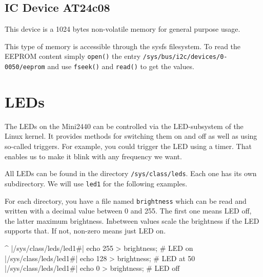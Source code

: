 
\newcommand{\perEepromName}{AT24c08}
\newcommand{\perEepromSize}{1024 bytes}
\newcommand{\perEepromPath}{0-0050}

\subsection{I\texttwosuperior C Device \perEepromName {}}	\label{sec:EEPROM}

This device is a \perEepromSize{} non-volatile memory for general purpose usage.

This type of memory is accessible through the sysfs filesystem. To read the
EEPROM content simply \texttt{open()} the entry
\texttt{/sys/bus/i2c/devices/\perEepromPath{}/eeprom} and use
\texttt{fseek()} and \texttt{read()} to get the values.


\newcommand{\perLedName}{led1}
\newcommand{\perAvailableTriggers}{[none] nand-disk mmc0 timer backlight}

\newcommand{\LedPath}{/sys/class/leds/\perLedName\#}

\section{LEDs}				\label{sec:LED}

The LEDs on the Mini2440 can be controlled via the LED-subsystem of the Linux
kernel. It provides methods for switching them on and off as well as using
so-called triggers.  For example, you could trigger the LED using a timer.
That enables us to make it blink with any frequency we want.

All LEDs can be found in the directory \texttt{/sys/class/leds}. Each one has
its own subdirectory. We will use \texttt{\perLedName} for the following
examples.

For each directory, you have a file named \texttt{brightness} which can be read and
written with a decimal value between 0 and 255. The first one means LED off,
the latter maximum brightness. Inbetween values scale the brightness if the LED
supports that. If not, non-zero means just LED on.

\begin{ptxshell}[escapechar=|]{^}
|\LedPath| echo 255 > brightness; # LED on
|\LedPath| echo 128 > brightness; # LED at 50%
|\LedPath| echo 0 > brightness; # LED off
\end{ptxshell}

